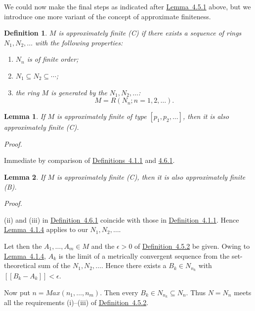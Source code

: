\documentclass[b5paper,twoside]{article}
\newcommand{\lemref}[2]{\hyperref[#1]{\mbox{Lemma~#2}}}
\newcommand{\defref}[2]{\hyperref[#1]{\mbox{Definition~#2}}}
\theoremstyle{mvnplain}
\newtheorem{lemma}{Lemma}[section]
\newtheorem{definition}{Definition}[section]
\renewenvironment{proof}[1][Proof]{%
  \par\addvspace{0.35\baselineskip}%
  \noindent\textit{#1.}\ \normalfont\ignorespaces
}{%
  \par\addvspace{0.35\baselineskip}%
}
\newcommand{\M}{\mathbf M}
\newcommand{\N}{\mathbf N}
\newcommand{\R}{\mathbf R}
\newcommand{\Metric}[1]{\left[\!\left[#1\right]\!\right]}
\def\M{M}%
\def\N{N}%
\def\R{R}%
\def\Metric#1{[[#1]]}%
\def\operatorname#1{#1}%
\begin{document}
We could now make the final steps as indicated after \lemref{lem:4.5.1}{4.5.1}
above, but we introduce one more variant of the concept of approximate
finiteness.

\begin{definition}\label{def:4.6.1}
\(\M\) is approximately finite (C) if there exists a sequence of rings
\(\N_1,\N_2,\ldots\) with the following properties:
\begin{enumerate}[label=(\roman*)]
\item \(\N_n\) is of finite order;
\item \(\N_1\subseteq\N_2\subseteq\cdots\);
\item the ring \(\M\) is generated by the \(\N_1,\N_2,\ldots\):
\[
 \M=\R(\N_n;n=1,2,\ldots).
\]
\end{enumerate}
\end{definition}

\begin{lemma}\label{lem:4.6.3}
If \(\M\) is approximately finite of type \([p_1,p_2,\ldots]\), then it is
also approximately finite (C).
\end{lemma}

\begin{proof}
Immediate by comparison of \hyperref[def:4.1.1]{\mbox{Definitions 4.1.1}}
and \hyperref[def:4.6.1]{\mbox{4.6.1}}.
\end{proof}

\begin{lemma}\label{lem:4.6.4}
If \(\M\) is approximately finite (C), then it is also approximately finite (B).
\end{lemma}

\begin{proof}
(ii) and (iii) in \defref{def:4.6.1}{4.6.1} coincide with those in
\defref{def:4.1.1}{4.1.1}. Hence \lemref{lem:4.1.4}{4.1.4} applies to our
\(\N_1,\N_2,\ldots\).

Let then the \(A_1,\ldots,A_m\in\M\) and the \(\epsilon>0\) of
\defref{def:4.5.2}{4.5.2} be given. Owing to \lemref{lem:4.1.4}{4.1.4},
\(A_k\) is the limit of a metrically convergent sequence from the
set-theoretical sum of the \(\N_1,\N_2,\ldots\). Hence there exists a
\(B_k\in\N_{n_k}\) with \(\Metric{B_k-A_k}<\epsilon\).

Now put \(n=\operatorname{Max}(n_1,\ldots,n_m)\). Then every
\(B_k\in\N_{n_k}\subseteq\N_n\). Thus \(\N=\N_n\) meets all the
requirements (i)--(iii) of \defref{def:4.5.2}{4.5.2}.
\end{proof}
\end{document}
